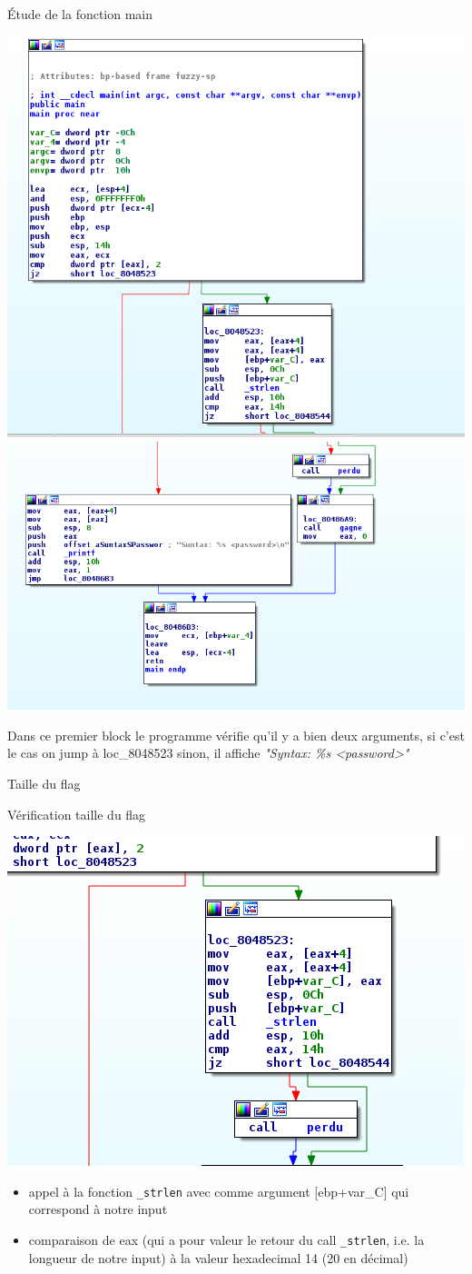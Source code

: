 \documentclass[10pt,sans,usenames,dvipsnames,french,compress]{beamer}
\begin{document}
\begin{frame}[fragile]{Étude de la fonction main}
	\vspace{-2mm}
	\begin{center}
		\includegraphics[width=0.5\linewidth]{114/main.png}
		\includegraphics[width=0.5\linewidth]{114/syntax.png}
	\end{center}

	\begin{block}{}
		Dans ce premier block le programme vérifie qu'il y a bien deux arguments, si c'est le cas on jump à loc\_8048523 sinon, il affiche \textit{"Syntax: \%s <password>"}
	\end{block}
\end{frame}

\begin{frame}[fragile]{Taille du flag}
	\begin{block}{Vérification taille du flag}
		\begin{center}
			\includegraphics[width=0.5\linewidth]{114/lenght.png}
		\end{center}
	\end{block}

	\begin{exampleblock}{}
		\begin{itemize}
			\item appel à la fonction \texttt{\_strlen} avec comme argument [ebp+var\_C] qui correspond à notre input
			\item comparaison de eax (qui a pour valeur le retour du call \texttt{\_strlen}, i.e. la longueur de notre input) à la valeur hexadecimal 14 (20 en décimal)
		\end{itemize}
	\end{exampleblock}
\end{frame}
\end{document}
